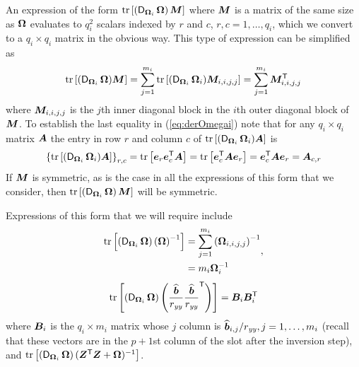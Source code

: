 \documentclass[12pt]{article}
\begin{document}
An expression of the form
$\operatorname{tr}\left[\left(\operatorname{\mathsf{D}}_{\bm{\Omega}_i}\bm{\Omega}\right)\bm{M}\right]$ where $\bm{M}$
is a matrix of the same size as $\bm{\Omega}$ evaluates to $q_i^2$ scalars
indexed by $r$ and $c$, $r,c=1,\dots,q_i$, which we convert to a
$q_i\times q_i$ matrix in the obvious way.  This type of expression
can be simplified as
\begin{equation}
  \label{eq:derOmegai}
  \operatorname{tr}\left[(\operatorname{\mathsf{D}}_{\bm{\Omega}_i}\bm{\Omega})\bm{M}\right]
  = \sum_{j=1}^{m_i}\operatorname{tr}\left[(\operatorname{\mathsf{D}}_{\bm{\Omega}_i}\bm{\Omega}_i)\bm{M}_{i,i,j,j}\right]
  = \sum_{j=1}^{m_i}\bm{M}_{i,i,j,j}^\mathsf{T}
\end{equation}
where $\bm{M}_{i,i,j,j}$ is the $j$th inner diagonal block in the $i$th
outer diagonal block of $\bm{M}$.  To establish the last equality in
(\ref{eq:derOmegai}) note that for any $q_i\times q_i$ matrix $\bm{A}$
the entry in row $r$ and column $c$ of
$\operatorname{tr}\left[(\operatorname{\mathsf{D}}_{\bm{\Omega}_i}\bm{\Omega}_i)\bm{A}\right]$ is
\begin{equation}
  \label{eq:rowRcolCentry}
  \left\{\operatorname{tr}\left[(\operatorname{\mathsf{D}}_{\bm{\Omega}_i}\bm{\Omega}_i)\bm{A}\right]\right\}_{r,c}
  = \operatorname{tr}\left[\bm{e}_r\bm{e}_c^\mathsf{T}\bm{A}\right]
  = \operatorname{tr}\left[\bm{e}_c^\mathsf{T}\bm{A}\bm{e}_r\right]
  = \bm{e}_c^\mathsf{T}\bm{A}\bm{e}_r
  = \bm{A}_{c,r}
\end{equation}
If $\bm{M}$ is symmetric, as is the case in all the expressions of this
form that we consider, then
$\operatorname{tr}\left[\left(\operatorname{\mathsf{D}}_{\bm{\Omega}_i}\bm{\Omega}\right)\bm{M}\right]$ will be
symmetric.

Expressions of this form that we will require include 
\begin{equation}
  \label{eq:derOmegaInv}
  \begin{aligned}
  \operatorname{tr}\left[\left(\operatorname{\mathsf{D}}_{\bm{\Omega}_i}\bm{\Omega}\right)\left(\bm{\Omega}\right)^{-1}\right]
    &= \sum_{j=1}^{m_i}\left(\bm{\Omega}_{i,i,j,j}\right)^{-1}\\
    &= m_i\bm{\Omega}_i^{-1}
  \end{aligned},
\end{equation}
\begin{equation}
  \label{eq:bbDer}
  \operatorname{tr}\left[\left(\operatorname{\mathsf{D}}_{\bm{\Omega}_i}\bm{\Omega}\right) \left(
      \frac{\widehat{\bm{b}}}{r_\mathit{yy}} \frac{\widehat{\bm{b}}}
      {r_\mathit{yy}} ^\mathsf{T}\right)\right] = \bm{B}_i \bm{B}_i^\mathsf{T}
\end{equation}
where $\bm{B}_i$ is the $q_i\times m_i$ matrix whose $j$ column is
$\widehat{\bm{b}}_{i,j}/r_\mathit{yy}, j=1,\dots,m_i$ (recall that these vectors
are in the $p+1$st column of the  slot after the inversion
step), and $\operatorname{tr} \left[ \left( \operatorname{\mathsf{D}}_{\bm{\Omega}_i} \bm{\Omega} \right)
  (\bm{Z}^\mathsf{T}\bm{Z}+\bm{\Omega})^{-1} \right]$.
\end{document}
